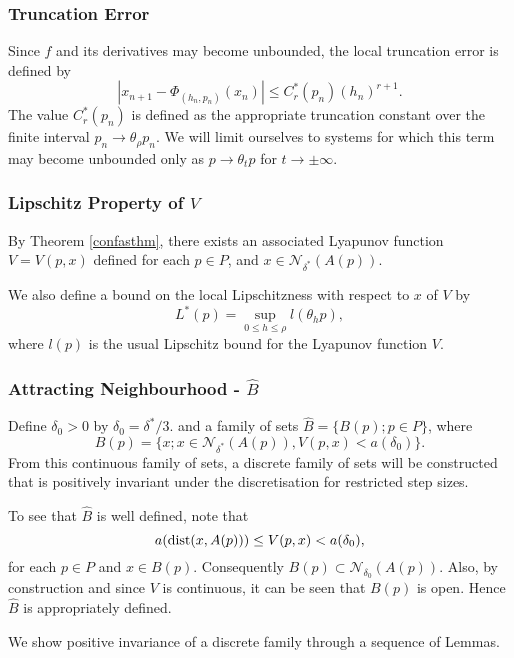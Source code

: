\subsubsection{Truncation Error}

Since $f$ and its derivatives may become unbounded, the local
truncation error is defined by
\begin{equation*}
|x_{n+1} - \Phi_{(h_n, p_{n})}(x_n)| \leq C^*_{r}(p_n)(h_n)^{r+1}.
\end{equation*}
The value $C^*_{r}(p_n)$ is defined as the appropriate truncation
constant over the finite interval $p_n \to \theta_{\rho}p_n$. We will limit
ourselves to systems for which this term may become unbounded only as $p \to
\theta_t p$ for $t \to \pm \infty$.

\subsubsection{Lipschitz Property of $V$}

By Theorem \ref{confasthm}, there exists an associated Lyapunov
function $V=V(p,x)$ defined for each $p \in P$, and $x \in
\mathcal{N}_{\delta^*}(A(p))$.

We also define a bound on the local Lipschitzness with respect to
$x$ of $V$ by
\[ L^*(p) = \sup_{0 \leq h \leq \rho} l(\theta_{h}p), \]
where $l(p)$ is the usual Lipschitz bound for the Lyapunov
function $V$.

\subsubsection{Attracting Neighbourhood - $\hat{B}$}

Define $\delta_0 > 0$ by $\delta_0 = \delta^*/3$. and a family of sets
$\hat{B} = \{ B(p) ; p \in P \}$, where
\[ B(p) = \{ x; x \in \mathcal{N}_{\delta^*}(A(p)), V(p, x) < a (\delta_0 )
        \}. \]
From this continuous family of sets, a discrete family of sets
will be constructed that is positively invariant under the
discretisation for restricted step sizes.

To see that $\hat{B}$ is well defined, note that
\[ a( {\rm dist}(x, A(p)) ) \leq V( p, x ) < a( \delta_0 ), \]
for each $p \in P$ and $x \in B(p)$.
Consequently $B(p) \subset \mathcal{N}_{\delta_0}(A(p))$. Also, by
construction and since $V$ is continuous, it can be seen that
$B(p)$ is open. Hence $\hat{B}$ is appropriately defined.

We show positive invariance of a discrete family through a
sequence of Lemmas.


